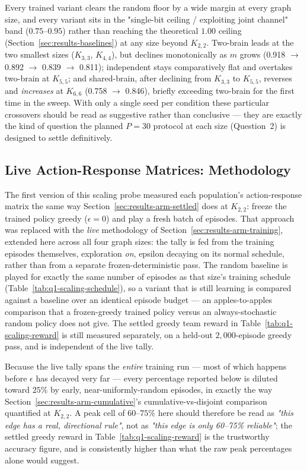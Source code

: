 \documentclass[a4paper,twoside,12pt]{report}
\begin{document}
Every trained variant clears the random floor by a wide margin at every
graph size, and every variant sits in the "single-bit ceiling / exploiting
joint channel" band ($0.75$--$0.95$) rather than reaching the theoretical
$1.00$ ceiling (Section~\ref{sec:results-baselines}) at any size beyond
$K_{2,2}$. Two-brain leads at the two smallest sizes ($K_{3,3}$, $K_{4,4}$),
but declines monotonically as $m$ grows (0.918 $\to$ 0.892 $\to$ 0.839 $\to$
0.811); independent stays comparatively flat and overtakes two-brain at
$K_{5,5}$; and shared-brain, after declining from $K_{3,3}$ to $K_{5,5}$,
reverses and \emph{increases} at $K_{6,6}$ (0.758 $\to$ 0.846), briefly
exceeding two-brain for the first time in the sweep. With only a single seed
per condition these particular crossovers should be read as suggestive
rather than conclusive --- they are exactly the kind of question the planned
$P=30$ protocol at each size (Question~2) is designed to settle definitively.

\subsection{Live Action-Response Matrices: Methodology}
\label{sec:results-scaling-methodology}

The first version of this scaling probe measured each population's
action-response matrix the same way Section~\ref{sec:results-arm-settled}
does at $K_{2,2}$: freeze the trained policy greedy ($\epsilon=0$) and play a
fresh batch of episodes. That approach was replaced with the \emph{live}
methodology of Section~\ref{sec:results-arm-training}, extended here across
all four graph sizes: the tally is fed from the training episodes themselves,
exploration \emph{on}, epsilon decaying on its normal schedule, rather than
from a separate frozen-deterministic pass. The random baseline is played for
exactly the same number of episodes as that size's training schedule
(Table~\ref{tab:q1-scaling-schedule}), so a variant that is still learning is
compared against a baseline over an identical episode budget --- an
apples-to-apples comparison that a frozen-greedy trained policy versus an
always-stochastic random policy does not give. The settled greedy team reward
in Table~\ref{tab:q1-scaling-reward} is still measured separately, on a
held-out $2{,}000$-episode greedy pass, and is independent of the live tally.

Because the live tally spans the \emph{entire} training run --- most of which
happens before $\epsilon$ has decayed very far --- every percentage reported
below is diluted toward $25\%$ by early, near-uniformly-random episodes, in
exactly the way Section~\ref{sec:results-arm-cumulative}'s cumulative-vs-disjoint
comparison quantified at $K_{2,2}$. A peak cell of $60$--$75\%$ here should
therefore be read as \emph{"this edge has a real, directional rule"}, not as
\emph{"this edge is only 60--75\% reliable"}; the settled greedy reward in
Table~\ref{tab:q1-scaling-reward} is the trustworthy accuracy figure, and is
consistently higher than what the raw peak percentages alone would suggest.
\end{document}
